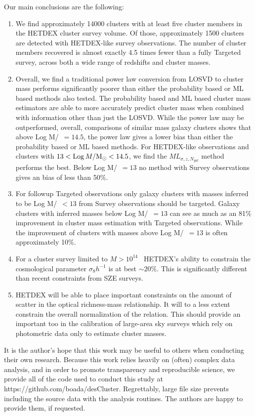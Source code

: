 \documentclass[fleqn,usenatbib]{mnras}
\begin{document}
Our main conclusions are the following:
\begin{enumerate}
	\item We find approximately 14000 clusters with at least five cluster members in the HETDEX cluster survey volume. Of those, approximately 1500 clusters are detected with HETDEX-like survey observations. The number of cluster members recovered is almost exactly 4.5 times fewer than a fully Targeted survey, across both a wide range of redshifts and cluster masses.
	\item Overall, we find a traditional power law conversion from LOSVD to cluster mass performs significantly poorer than either the probability based or ML based methods also tested. The probability based and ML based cluster mass estimators are able to more accurately predict cluster mass when combined with information other than just the LOSVD. While the power law may be outperformed, overall, comparisons of similar mass galaxy clusters shows that above Log M/\Msol\ $=14.5$, the power law gives a lower bias than either the probability based or ML based methods. For HETDEX-like observations and clusters with $13 < \mathrm{Log}\, M/\hbox{$\mathrm{M}_\odot$} <14.5$, we find the $ML_{\sigma, z, N_{gal}}$ method performs the best. Below Log M/\Msol\ $=13$ no method with Survey observations gives an bias of less than 50\%.
	\item For followup Targeted observations only galaxy clusters with masses inferred to be Log M/\Msol\ $<13$ from Survey observations should be targeted. Galaxy clusters with inferred masses below Log M/\Msol\ $=13$ can see as much as an 81\% improvement in cluster mass estimation with Targeted observations. While the improvement of clusters with masses above Log M/\Msol\ $=13$ is often approximately 10\%.
	\item For a cluster survey limited to $M > 10^{14}$ \Msol\, HETDEX's ability to constrain the cosmological parameter $\sigma_8 h^{-1}$ is at best $\sim20\%$. This is significantly different than recent constraints from SZE surveys.
	\item HETDEX will be able to place important constraints on the amount of scatter in the optical richness-mass relationship. It will to a less extent constrain the overall normalization of the relation. This should provide an important too in the calibration of large-area sky surveys which rely on photometric data only to estimate cluster masses.
\end{enumerate}

It is the author's hope that this work may be useful to others when conducting their own research. Because this work relies heavily on (often) complex data analysis, and in order to promote transparency and reproducible science, we provide all of the code used to conduct this study at https://github.com/boada/desCluster. Regrettably, large file size prevents including the source data with the analysis routines. The authors are happy to provide them, if requested.
\end{document}
